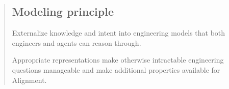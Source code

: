 

\begin{quote}
\mbox{}%
\subsection{Modeling principle}\label{heading:modeling-principle}

Externalize knowledge and intent into engineering models that both engineers and agents can reason through.

Appropriate representations make otherwise intractable engineering questions manageable and make additional properties available for Alignment.
\end{quote}

